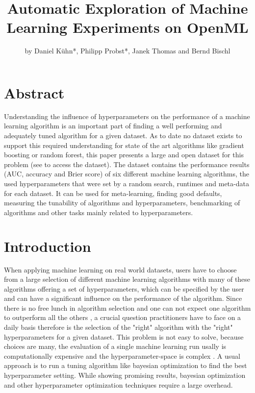 \documentclass{article}
\begin{document}



\title{Automatic Exploration of Machine Learning Experiments on OpenML}
\author{by Daniel Kühn*, Philipp Probst*, Janek Thomas and Bernd Bischl}

\maketitle

\section*{Abstract}
Understanding the influence of hyperparameters on the performance of a machine learning algorithm is an important part of finding a well performing and adequately tuned algorithm for a given dataset. As to date no dataset exists to support this required understanding for state of the art algorithms like gradient boosting or random forest, this paper presents a large and open dataset for this problem (see \citep{Probst2018} to access the dataset). The dataset contains the performance results  (AUC, accuracy and Brier score) of six different machine learning algorithms, the used hyperparameters that were set by a random search, runtimes and meta-data for each dataset. It can be used for meta-learning, finding good defaults, measuring the tunability of algorithms and hyperparameters, benchmarking of algorithms and other tasks mainly related to hyperparameters. %


\section{Introduction}

When applying machine learning on real world datasets, users have to choose from a large selection of different machine learning algorithms with many of these algorithms offering a set of hyperparameters, which can be specified by the user and can have a significant influence on the performance of the algorithm. Since there is no free lunch in algorithm selection and one can not expect one algorithm to outperform all the others \citep{Wolpert2001}, a crucial question practitioners have to face on a daily basis therefore is the selection of the "right" algorithm with the "right" hyperparameters for a given dataset. This problem is not easy to solve, because choices are many, the evaluation of a single machine learning run usally is computationally expensive and the hyperparameter-space is complex \citep{Claesen2015}. A usual approach is to run a tuning algorithm like bayesian optimization to find the best hyperparameter setting. While showing promising results, bayesian optimization and other hyperparameter optimization techniques require a large overhead. 
\end{document}
